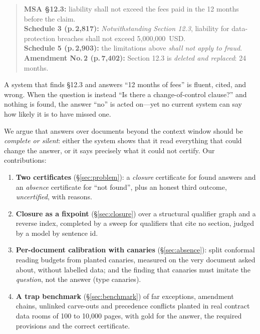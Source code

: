\documentclass[11pt]{article}
\begin{document}
\begin{quote}\small
\textbf{MSA §12.3:} liability shall not exceed the fees paid in the 12 months before the claim.\\
\textbf{Schedule 3 (p.\,2,817):} \emph{Notwithstanding Section 12.3}, liability for data-protection breaches shall not exceed 5,000,000~USD.\\
\textbf{Schedule 5 (p.\,2,903):} the limitations above \emph{shall not apply to fraud}.\\
\textbf{Amendment No.\,2 (p.\,7,402):} Section 12.3 is \emph{deleted and replaced}: 24 months.
\end{quote}

\noindent A system that finds §12.3 and answers ``12 months of fees'' is fluent, cited, and wrong. When the question is instead ``Is there a change-of-control clause?'' and nothing is found, the answer ``no'' is acted on---yet no current system can say how likely it is to have missed one.

We argue that answers over documents beyond the context window should be \emph{complete or silent}: either the system shows that it read everything that could change the answer, or it says precisely what it could not certify. Our contributions:
\begin{enumerate}
\item \textbf{Two certificates} (\S\ref{sec:problem}): a \emph{closure} certificate for found answers and an \emph{absence} certificate for ``not found'', plus an honest third outcome, \emph{uncertified}, with reasons.
\item \textbf{Closure as a fixpoint} (\S\ref{sec:closure}) over a structural qualifier graph and a reverse index, completed by a sweep for qualifiers that cite no section, judged by a model by sentence id.
\item \textbf{Per-document calibration with canaries} (\S\ref{sec:absence}): split conformal reading budgets from planted canaries, measured on the very document asked about, without labelled data; and the finding that canaries must imitate the \emph{question}, not the answer (type canaries).
\item \textbf{A trap benchmark} (\S\ref{sec:benchmark}) of far exceptions, amendment chains, unlinked carve-outs and precedence conflicts planted in real contract data rooms of 100 to 10,000 pages, with gold for the answer, the required provisions and the correct certificate.
\end{enumerate}

\end{document}
